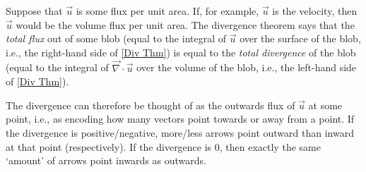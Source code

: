 Suppose that \(\vec{u}\) is some flux per unit area. If, for example, \(\vec{u}\) is the velocity, then \(\vec{u}\) would be the volume flux per unit area. The divergence theorem says that the \textit{total flux} out of some blob (equal to the integral of \(\vec{u}\) over the surface of the blob, i.e., the right-hand side of \ref{Div Thm}) is equal to the \textit{total divergence} of the blob (equal to the integral of \(\vec{\nabla}\cdot\vec{u}\) over the volume of the blob, i.e., the left-hand side of \ref{Div Thm}). 

The divergence can therefore be thought of as the outwards flux of \(\vec{u}\) at some point, i.e., as encoding how many vectors point towards or away from a point. If the divergence is positive/negative, more/less arrows point outward than inward at that point (respectively). If the divergence is \(0\), then exactly the same `amount' of arrows point inwards as outwards. 

